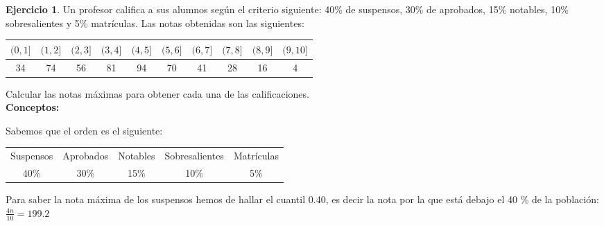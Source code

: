 \documentclass[a4paper, 12pt]{article}
\theoremstyle{definition}
\newtheorem{ej}{Ejercicio}
\begin{document}
\begin{ej}
Un profesor califica a sus alumnos según el criterio siguiente: 40\% de suspensos, 30\% de aprobados, 15\% notables, 10\% sobresalientes y 5\% matrículas. Las notas obtenidas son las siguientes:

\begin{center}
\begin{tabular}{|c|c|c|c|c|c|c|c|c|c|}
\hline
     \((0,1]\) & \((1,2]\) & \((2,3]\) & \((3,4]\) & \((4,5]\) & \((5,6]\) & \((6,7]\) & \((7,8]\) & \((8,9]\) & \((9,10]\) \\
     \hline
     34 & 74 & 56 & 81 & 94 & 70 & 41 & 28 & 16 & 4 \\
     \hline
\end{tabular}
\end{center}

Calcular las notas máximas para obtener cada una de las calificaciones. \\

\bigskip
\textbf{Conceptos:}
\begin{center}
\end{center}
\bigskip
Sabemos que el orden es el siguiente:

\begin{center}
    \begin{tabular}{c c c c c}
         Suspensos & Aprobados & Notables & Sobresalientes & Matrículas  \\
         40\% & 30\% & 15\% & 10\% & 5\% 
    \end{tabular}
\end{center}

Para saber la nota máxima de los suspensos hemos de hallar el cuantil 0.40, es decir la nota por la que está debajo el 40 \% de la población: \(\frac{4n}{10} = 199.2\)


\end{ej}
\end{document}
